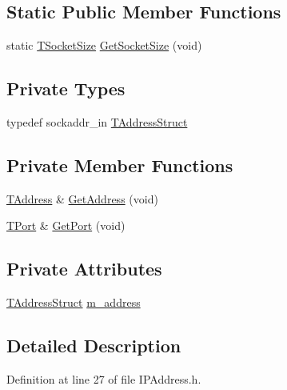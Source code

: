 \subsection*{Static Public Member Functions}
\begin{DoxyCompactItemize}
\item 
static \hyperlink{class_i_p_address_a28c76ca7e5d4aa86d2caf0b742a23cdb}{T\-Socket\-Size} \hyperlink{class_i_p_address_abdbc7cc25dc15d9e85ceb2e1d3125e22}{Get\-Socket\-Size} (void)
\end{DoxyCompactItemize}
\subsection*{Private Types}
\begin{DoxyCompactItemize}
\item 
typedef sockaddr\-\_\-in \hyperlink{class_i_p_address_a45062a631f57459b18c10c1c8fe310bf}{T\-Address\-Struct}
\end{DoxyCompactItemize}
\subsection*{Private Member Functions}
\begin{DoxyCompactItemize}
\item 
\hyperlink{class_i_p_address_a36831f63346275f44e8747d77a2a5d51}{T\-Address} \& \hyperlink{class_i_p_address_a0c90b37a86811781d4422c0dd2d5b6b5}{Get\-Address} (void)
\item 
\hyperlink{class_i_p_address_a51188195685c31d4258c0a078cc37154}{T\-Port} \& \hyperlink{class_i_p_address_a5c8a6aeae1105603538c2661c68fd6bb}{Get\-Port} (void)
\end{DoxyCompactItemize}
\subsection*{Private Attributes}
\begin{DoxyCompactItemize}
\item 
\hyperlink{class_i_p_address_a45062a631f57459b18c10c1c8fe310bf}{T\-Address\-Struct} \hyperlink{class_i_p_address_aaafe20f26b2569a5ac9cd3b61b5c0c50}{m\-\_\-address}
\end{DoxyCompactItemize}


\subsection{Detailed Description}


Definition at line 27 of file I\-P\-Address.\-h.



